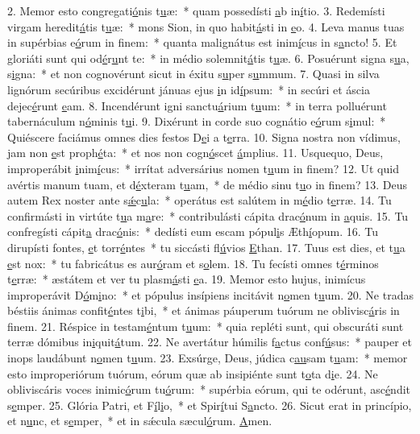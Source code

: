 2. Memor esto congregati\uline{ó}nis t\uline{u}æ:~* quam possedísti \uline{a}b in\uline{í}tio.
3. Redemísti virgam heredit\uline{á}tis t\uline{u}æ:~* mons Sion, in quo habit\uline{á}sti in \uline{e}o.
4. Leva manus tuas in supérbias e\uline{ó}rum in f\uline{i}nem:~* quanta malignátus est inim\uline{í}cus in s\uline{a}ncto!
5. Et gloriáti sunt qui od\uline{é}r\uline{u}nt te:~* in médio solemnit\uline{á}tis t\uline{u}æ.
6. Posuérunt signa s\uline{u}a, s\uline{i}gna:~* et non cognovérunt sicut in éxitu s\uline{u}per s\uline{u}mmum.
7. Quasi in silva lignórum secúribus excidérunt jánuas ejus \uline{i}n id\uline{í}psum:~* in secúri et áscia dejec\uline{é}runt \uline{e}am.
8. Incendérunt igni sanctu\uline{á}rium t\uline{u}um:~* in terra polluérunt tabernáculum n\uline{ó}minis t\uline{u}i.
9. Dixérunt in corde suo cognátio e\uline{ó}rum s\uline{i}mul:~* Quiéscere faciámus omnes dies festos D\uline{e}i a t\uline{e}rra.
10. Signa nostra non vídimus, jam non \uline{e}st proph\uline{é}ta:~* et nos non cogn\uline{ó}scet \uline{á}mplius.
11. Usquequo, Deus, improperábit \uline{i}nim\uline{í}cus:~* irrítat adversárius nomen t\uline{u}um in f\uline{i}nem?
12. Ut quid avértis manum tuam, et d\uline{é}xteram t\uline{u}am,~* de médio sinu t\uline{u}o in f\uline{i}nem?
13. Deus autem Rex noster ante s\uline{ǽ}c\uline{u}la:~* operátus est salútem in m\uline{é}dio t\uline{e}rræ.
14. Tu confirmásti in virtúte t\uline{u}a m\uline{a}re:~* contribulásti cápita drac\uline{ó}num in \uline{a}quis.
15. Tu confregísti cápit\uline{a} drac\uline{ó}nis:~* dedísti eum escam pópul\uline{i}s Æth\uline{í}opum.
16. Tu dirupísti fontes, \uline{e}t torr\uline{é}ntes~* tu siccásti fl\uline{ú}vios \uline{E}than.
17. Tuus est dies, et t\uline{u}a \uline{e}st nox:~* tu fabricátus es aur\uline{ó}ram et s\uline{o}lem.
18. Tu fecísti omnes t\uline{é}rminos t\uline{e}rræ:~* æstátem et ver tu plasm\uline{á}sti \uline{e}a.
19. Memor esto hujus, inimícus improperávit D\uline{ó}m\uline{i}no:~* et pópulus insípiens incitávit n\uline{o}men t\uline{u}um.
20. Ne tradas béstiis ánimas confit\uline{é}ntes t\uline{i}bi,~* et ánimas páuperum tuórum ne oblivisc\uline{á}ris in f\uline{i}nem.
21. Réspice in testam\uline{é}ntum t\uline{u}um:~* quia repléti sunt, qui obscuráti sunt terræ dómibus in\uline{i}quit\uline{á}tum.
22. Ne avertátur húmilis f\uline{a}ctus conf\uline{ú}sus:~* pauper et inops laudábunt n\uline{o}men t\uline{u}um.
23. Exsúrge, Deus, júdica c\uline{au}sam t\uline{u}am:~* memor esto improperiórum tuórum, eórum quæ ab insipiénte sunt t\uline{o}ta d\uline{i}e.
24. Ne obliviscáris voces inimic\uline{ó}rum tu\uline{ó}rum:~* supérbia eórum, qui te odérunt, asc\uline{é}ndit s\uline{e}mper.
25. Glória Patri, et F\uline{í}l\uline{i}o,~* et Spir\uline{í}tui S\uline{a}ncto.
26. Sicut erat in princípio, et n\uline{u}nc, et s\uline{e}mper,~* et in sǽcula sæcul\uline{ó}rum. \uline{A}men.
